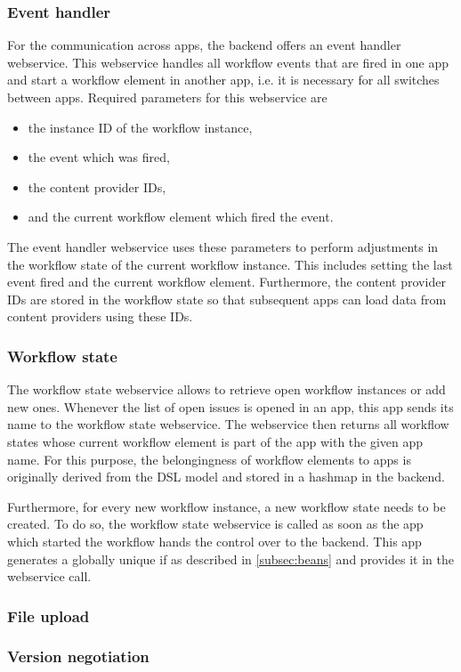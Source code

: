 \subsubsection{Event handler} 

For the communication across apps, the backend offers an event handler webservice. This webservice handles all workflow events that are fired in one app and start a workflow element in another app, i.e. it is necessary for all switches between apps. Required parameters for this webservice are

\begin{itemize}
\item the instance ID of the workflow instance,
\item the event which was fired,
\item the content provider IDs,
\item and the current workflow element which fired the event.
\end{itemize}

The event handler webservice uses these parameters to perform adjustments in the workflow state of the current workflow instance. This includes setting the last event fired and the current workflow element. Furthermore, the content provider IDs are stored in the workflow state so that subsequent apps can load data from content providers using these IDs.

\subsubsection{Workflow state} 

The workflow state webservice allows to retrieve open workflow instances or add new ones. Whenever the list of open issues is opened in an app, this app sends its name to the workflow state webservice. The webservice then returns all workflow states whose current workflow element is part of the app with the given app name. For this purpose, the belongingness of workflow elements to apps is originally derived from the DSL model and stored in a hashmap in the backend.

Furthermore, for every new workflow instance, a new workflow state needs to be created. To do so, the workflow state webservice is called as soon as the app which started the workflow hands the control over to the backend. This app generates a globally unique if as described in \ref{subsec:beans} and provides it in the webservice call.

\subsubsection{File upload} 

\subsubsection{Version negotiation} 



